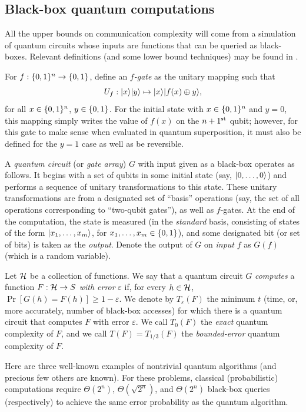 \subsection{Black-box quantum computations}

All the upper bounds on communication complexity will come from a 
simulation of quantum circuits whose inputs are functions that 
can be queried as black-boxes.
Relevant definitions (and some lower bound techniques) may be 
found in \cite{BV93,BB94,BBBV93,Ya93}.

For $f : \01^n \rightarrow \01$, define an {\em $f$-gate} as the 
unitary mapping such that
\begin{equation}
U_f : \mbox{$| x \rangle$}\mbox{$| y \rangle$} \mapsto \mbox{$| x \rangle$}\mbox{$| f(x) \oplus y \rangle$},
\label{gate}
\end{equation}
for all $x \in \01^n$, $y \in \01$.
For the initial state with $x \in \01^n$ and $y=0$, this mapping simply 
writes the value of $f(x)$ on the $n+1^{\mbox{\scriptsize st}}$ qubit; 
however, for this gate to make sense when evaluated in quantum 
superposition, it must also be defined for the $y=1$ case as well as be 
reversible.

A {\em quantum circuit} (or {\em gate array}) $G$ with input given as a 
black-box operates as follows.
It begins with a set of qubits in some initial state (say, 
$\mbox{$| 0,\ldots,0 \rangle$}$) and performs a sequence of unitary transformations 
to this state.
These unitary transformations are from a designated set of ``basis'' 
operations (say, the set of all operations corresponding to ``two-qubit 
gates''), as well as $f$-gates.
At the end of the computation, the state is measured (in the {\em standard\/} 
basis, consisting of states of the form $\mbox{$| x_1,\ldots,x_m \rangle$}$, for 
$x_1,\ldots,x_m \in \01$), and some designated bit (or set of bits) is taken 
as the {\em output\/}.
Denote the output of $G$ on {\em input\/} $f$ as $G(f)$ 
(which is a random variable).

Let ${\cal H}$ be a collection of functions.
We say that a quantum circuit $G$ {\em computes} a function 
$F: {\cal H} \rightarrow S$ {\em with error} $\varepsilon$ if, for every $h\in {\cal H}$, 
$\Pr[G(h) = F(h)] \geq 1 - \varepsilon$.
We denote by $T_{\varepsilon}(F)$ the minimum $t$ (time, or, more accurately, 
number of black-box accesses) for which there is a quantum circuit that 
computes $F$ with error $\varepsilon$.
We call $T_0(F)$ the {\em exact} quantum complexity of $F$, and 
we call $T(F) = T_{1/3}(F)$ the {\em bounded-error} quantum complexity of 
$F$.

Here are three well-known examples of nontrivial quantum algorithms (and 
precious few others are known).
For these problems, classical (probabilistic) computations require 
$\Theta(2^n)$, $\Theta(\sqrt{2^n})$, and $\Theta(2^n)$ black-box queries 
(respectively) to achieve the same error probability as the quantum 
algorithm.

